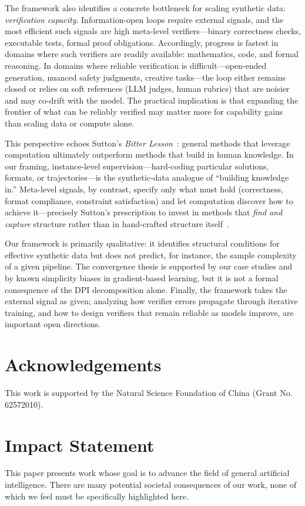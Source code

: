 \documentclass{article}
\theoremstyle{plain}
\theoremstyle{definition}
\theoremstyle{remark}
\begin{document}
The framework also identifies a concrete bottleneck for scaling synthetic data: \textit{verification capacity}. Information-open loops require external signals, and the most efficient such signals are high meta-level verifiers---binary correctness checks, executable tests, formal proof obligations. Accordingly, progress is fastest in domains where such verifiers are readily available: mathematics, code, and formal reasoning. In domains where reliable verification is difficult---open-ended generation, nuanced safety judgments, creative tasks---the loop either remains closed or relies on soft references (LLM judges, human rubrics) that are noisier and may co-drift with the model. The practical implication is that expanding the frontier of what can be reliably verified may matter more for capability gains than scaling data or compute alone.

This perspective echoes Sutton's \textit{Bitter Lesson}~\cite{suttonBitterLesson2019}: general methods that leverage computation ultimately outperform methods that build in human knowledge. In our framing, instance-level supervision---hard-coding particular solutions, formats, or trajectories---is the synthetic-data analogue of ``building knowledge in.'' Meta-level signals, by contrast, specify only what must hold (correctness, format compliance, constraint satisfaction) and let computation discover how to achieve it---precisely Sutton's prescription to invest in methods that \textit{find and capture} structure rather than in hand-crafted structure itself~\cite{suttonBitterLesson2019}.

Our framework is primarily qualitative: it identifies structural conditions for effective synthetic data but does not predict, for instance, the sample complexity of a given pipeline. The convergence thesis is supported by our case studies and by known simplicity biases in gradient-based learning, but it is not a formal consequence of the DPI decomposition alone. Finally, the framework takes the external signal as given; analyzing how verifier errors propagate through iterative training, and how to design verifiers that remain reliable as models improve, are important open directions.


\section*{Acknowledgements}
This work is supported by the Natural Science Foundation of China (Grant No. 62572010).

\section*{Impact Statement}
This paper presents work whose goal is to advance the field of general artificial intelligence. There are many potential societal consequences of our work, none of which we feel must be specifically highlighted here.



\end{document}
